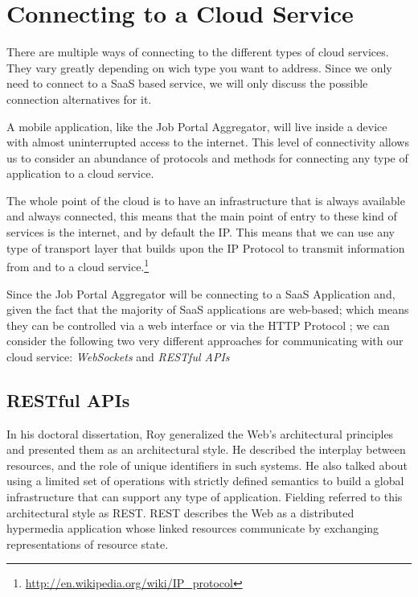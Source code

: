 \chapter{Connecting to a Cloud Service}\label{ch:introduction}

There are multiple ways of connecting to the different types of cloud services. They vary greatly depending on wich type you want to address. Since we only need to connect to a \ac{SaaS} based service, we will only discuss the possible connection alternatives for it.

A mobile application, like the Job Portal Aggregator, will live inside a device with almost uninterrupted access to the internet. This level of connectivity allows us to consider an abundance of protocols and methods for connecting any type of application to a cloud service.

The whole point of the cloud is to have an infrastructure that is always available and always connected, this means that the main point of entry to these kind of services is the internet, and by default the \ac{IP}. This means that we can use any type of transport layer that builds upon the \ac{IP} Protocol to transmit information from and to a cloud service.\footnote{\url{http://en.wikipedia.org/wiki/IP_protocol}}  

Since the Job Portal Aggregator will be connecting to a \ac{SaaS} Application and, given the fact that the majority of \ac{SaaS} applications are web-based; which means they can be controlled via a web interface or via the HTTP Protocol \cite{mcwherter:2012}; we can consider the following two very different approaches for communicating with our cloud service: \textit{WebSockets} and \textit{RESTful APIs}

\section{RESTful APIs}
In his doctoral dissertation, Roy \citeauthor{fielding:2000} generalized the Web's architectural principles and presented them as an architectural style. He described the interplay between resources, and the role of unique identifiers in such systems. He also talked about using a limited set of operations with strictly defined semantics to build a global infrastructure that can support any type of application. Fielding referred to this architectural style as \ac{REST}. \ac{REST} describes the Web as a distributed hypermedia application whose linked resources communicate by exchanging representations of resource state. \cite{webber:2010}

